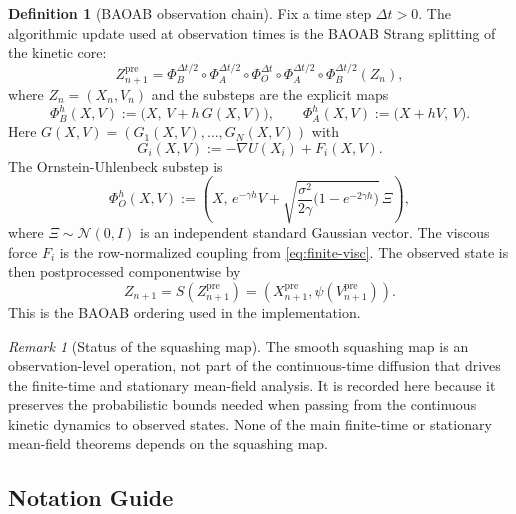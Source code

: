 \documentclass[11pt]{article}
\theoremstyle{definition}
\newtheorem{definition}[theorem]{Definition}
\theoremstyle{remark}
\newtheorem{remark}[theorem]{Remark}
\begin{document}
\begin{definition}[BAOAB observation chain]\label{def:baoab}
Fix a time step \(\Delta t>0\). The algorithmic update used at observation
times is the BAOAB Strang splitting of the kinetic core:
\[
Z_{n+1}^{\mathrm{pre}}
=
\Phi_B^{\Delta t/2}\circ \Phi_A^{\Delta t/2}\circ \Phi_O^{\Delta t}
\circ \Phi_A^{\Delta t/2}\circ \Phi_B^{\Delta t/2}(Z_n),
\]
where \(Z_n=(X_n,V_n)\) and the substeps are the explicit maps
\[
\Phi_B^h(X,V)
:=
\bigl(X,\,V+h\,G(X,V)\bigr),
\qquad
\Phi_A^h(X,V)
:=
\bigl(X+hV,\,V\bigr).
\]
Here \(G(X,V)=(G_1(X,V),\dots,G_N(X,V))\) with
\[
G_i(X,V):=-\nabla U(X_i)+F_i(X,V).
\]
The Ornstein-Uhlenbeck substep is
\[
\Phi_O^h(X,V)
:=
\left(X,\,e^{-\gamma h}V+\sqrt{\frac{\sigma^2}{2\gamma}\bigl(1-e^{-2\gamma h}\bigr)}\,\Xi\right),
\]
where \(\Xi\sim\mathcal N(0,I)\) is an independent standard Gaussian vector.
The viscous force \(F_i\) is the row-normalized coupling from
\eqref{eq:finite-visc}. The observed state is then postprocessed
componentwise by
\[
Z_{n+1}=S(Z_{n+1}^{\mathrm{pre}})=(X_{n+1}^{\mathrm{pre}},\psi(V_{n+1}^{\mathrm{pre}})).
\]
This is the BAOAB ordering used in the implementation.
\end{definition}

\begin{remark}[Status of the squashing map]
The smooth squashing map is an observation-level operation, not part of the
continuous-time diffusion that drives the finite-time and stationary mean-field
analysis. It is recorded here because it preserves the probabilistic bounds
needed when passing from the continuous kinetic dynamics to observed states.
None of the main finite-time or stationary mean-field theorems depends on the
squashing map.
\end{remark}

\subsection*{Notation Guide}
\end{document}
